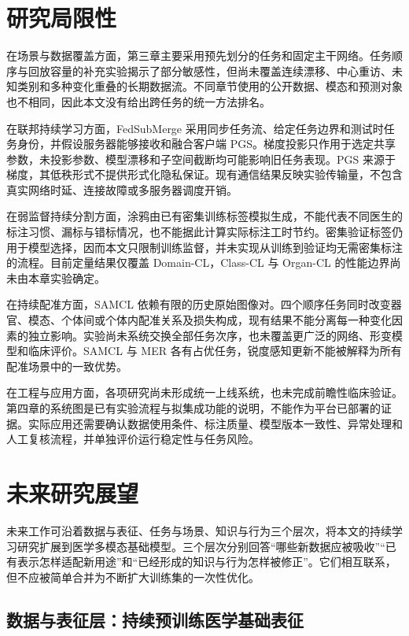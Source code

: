 \section{研究局限性}
\label{sec:conclusion-limitations}

在场景与数据覆盖方面，第三章主要采用预先划分的任务和固定主干网络。任务顺序与回放容量的补充实验揭示了部分敏感性，但尚未覆盖连续漂移、中心重访、未知类别和多种变化重叠的长期数据流。不同章节使用的公开数据、模态和预测对象也不相同，因此本文没有给出跨任务的统一方法排名。

在联邦持续学习方面，FedSubMerge 采用同步任务流、给定任务边界和测试时任务身份，并假设服务器能够接收和融合客户端 PGS。梯度投影只作用于选定共享参数，未投影参数、模型漂移和子空间截断均可能影响旧任务表现。PGS 来源于梯度，其低秩形式不提供形式化隐私保证。现有通信结果反映实验传输量，不包含真实网络时延、连接故障或多服务器调度开销。

在弱监督持续分割方面，涂鸦由已有密集训练标签模拟生成，不能代表不同医生的标注习惯、漏标与错标情况，也不能据此计算实际标注工时节约。密集验证标签仍用于模型选择，因而本文只限制训练监督，并未实现从训练到验证均无需密集标注的流程。目前定量结果仅覆盖 Domain-CL，Class-CL 与 Organ-CL 的性能边界尚未由本章实验确定。

在持续配准方面，SAMCL 依赖有限的历史原始图像对。四个顺序任务同时改变器官、模态、个体间或个体内配准关系及损失构成，现有结果不能分离每一种变化因素的独立影响。实验尚未系统交换全部任务次序，也未覆盖更广泛的网络、形变模型和临床评价。SAMCL 与 MER 各有占优任务，锐度感知更新不能被解释为所有配准场景中的一致优势。

在工程与应用方面，各项研究尚未形成统一上线系统，也未完成前瞻性临床验证。第四章的系统图是已有实验流程与拟集成功能的说明，不能作为平台已部署的证据。实际应用还需要确认数据使用条件、标注质量、模型版本一致性、异常处理和人工复核流程，并单独评价运行稳定性与任务风险。

\section{未来研究展望}
\label{sec:conclusion-future}

未来工作可沿着数据与表征、任务与场景、知识与行为三个层次，将本文的持续学习研究扩展到医学多模态基础模型。三个层次分别回答“哪些新数据应被吸收”“已有表示怎样适配新用途”和“已经形成的知识与行为怎样被修正”。它们相互联系，但不应被简单合并为不断扩大训练集的一次性优化。

\subsection{数据与表征层：持续预训练医学基础表征}

